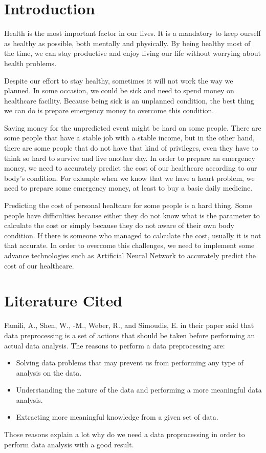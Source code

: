 \documentclass[a4paper, 12pt]{article}
\begin{document}
\justifying
\begin{multicols}{2}
\section{Introduction}
Health is the most important factor in our lives. It is a mandatory to keep ourself as healthy as possible, both mentally and physically. By being healthy most of the time, we can stay productive and enjoy living our life without worrying about health problems.

Despite our effort to stay healthy, sometimes it will not work the way we planned. In some occasion, we could be sick and need to spend money on healthcare facility. Because being sick is an unplanned condition, the best thing we can do is prepare emergency money to overcome this condition.

Saving money for the unpredicted event might be hard on some people. There are some people that have a stable job with a stable income, but in the other hand, there are some people that do not have that kind of privileges, even they have to think so hard to survive and live another day. In order to prepare an emergency money, we need to accurately predict the cost of our healthcare according to our body's condition. For example when we know that we have a heart problem, we need to
  prepare some emergency money, at least to buy a basic daily medicine.

Predicting the cost of personal healtcare for some people is a hard thing. Some people have difficulties because either they do not know what is the parameter to calculate the cost or simply because they do not aware of their own body condition. If there is someone who managed to calculate the cost, usually it is not that accurate. In order to overcome this challenges, we need to implement some advance technologies such as Artificial Neural Network to accurately predict the cost
  of our healthcare.

\section{Literature Cited}
Famili, A., Shen, W., -M., Weber, R., and Simoudis, E. in their paper said that data preprocessing is a set of actions that should be taken before performing an actual data analysis. The reasons to perform a data preprocessing are:
  \begin{itemize}
    \item Solving data problems that may prevent us from performing any type of analysis on the data.
    \item Understanding the nature of the data and performing a more meaningful data analysis.
    \item Extracting more meaningful knowledge from a given set of data.
  \end{itemize}
Those reasons explain a lot why do we need a data proprocessing in order to perform data analysis with a good result. \cite{famili1997}


\end{multicols}
\end{document}
